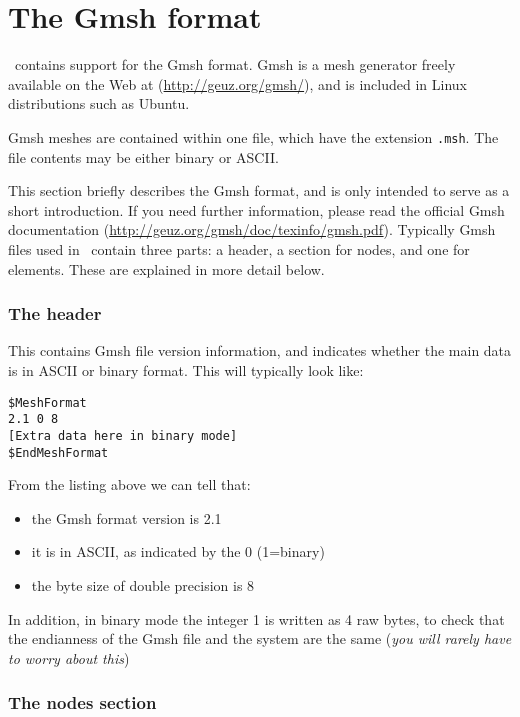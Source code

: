 \section{The Gmsh format}\label{sec:gmsh_format}

\fluidity\ contains  support for the Gmsh format. Gmsh is a mesh
generator freely available on the Web at (\url{http://geuz.org/gmsh/}), and
is included in Linux distributions such as Ubuntu.

Gmsh meshes are contained within one file, which have
the extension \lstinline[language=bash]+.msh+. The file contents may
be either binary or ASCII.

This section briefly describes the Gmsh format, and is only intended
to serve as a short introduction. If you need further
information, please read the official Gmsh documentation
(\url{http://geuz.org/gmsh/doc/texinfo/gmsh.pdf}).
Typically Gmsh files used in \fluidity\ contain three parts: a header, a
section for nodes, and one for elements. These  are explained in more
detail below.

\subsubsection*{The header}\label{sec:gmsh_header_section}
This contains Gmsh file version information, and indicates whether
the main data is in ASCII or binary format. This will typically look like:
\begin{lstlisting}
$MeshFormat
2.1 0 8
[Extra data here in binary mode]
$EndMeshFormat
\end{lstlisting}

From the listing above we can tell that:
\begin{itemize}
\item the Gmsh format version is 2.1
\item it is in ASCII, as indicated by the 0 (1=binary)
\item the byte size of double precision is 8
\end{itemize}
In addition, in binary mode the integer 1 is written as 4 raw bytes, to check that the endianness of the Gmsh file and the system are the same (\textit{you will rarely have to worry about this})


\subsubsection*{The nodes section}\label{sec:gmsh_nodes_section}


